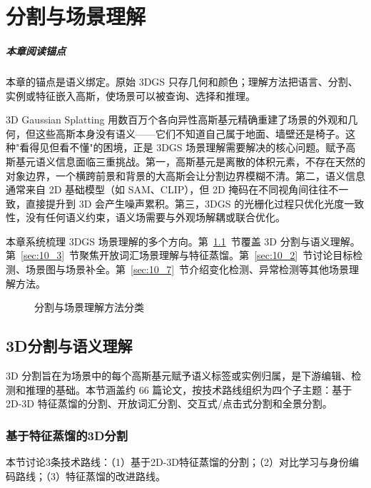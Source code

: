 \chapter{分割与场景理解}
\label{ch:10}

\paragraph*{本章阅读锚点}
本章的锚点是语义绑定。原始 3DGS 只存几何和颜色；理解方法把语言、分割、实例或特征嵌入高斯，使场景可以被查询、选择和推理。


3D Gaussian Splatting 用数百万个各向异性高斯基元精确重建了场景的外观和几何，但这些高斯本身没有语义——它们不知道自己属于地面、墙壁还是椅子。这种"看得见但看不懂"的困境，正是 3DGS 场景理解需要解决的核心问题。赋予高斯基元语义信息面临三重挑战。第一，高斯基元是离散的体积元素，不存在天然的对象边界，一个横跨前景和背景的大高斯会让分割边界模糊不清。第二，语义信息通常来自 2D 基础模型（如 SAM、CLIP），但 2D 掩码在不同视角间往往不一致，直接提升到 3D 会产生噪声累积。第三，3DGS 的光栅化过程只优化光度一致性，没有任何语义约束，语义场需要与外观场解耦或联合优化。

本章系统梳理 3DGS 场景理解的多个方向。第~\ref{sec:10_1}~节覆盖 3D 分割与语义理解。第~\ref{sec:10_3}~节聚焦开放词汇场景理解与特征蒸馏。第~\ref{sec:10_2}~节讨论目标检测、场景图与场景补全。第~\ref{sec:10_7}~节介绍变化检测、异常检测等其他场景理解方法。

\begin{figure}[htbp]
\centering
\resizebox{\textwidth}{!}{}
\caption{分割与场景理解方法分类}
\label{fig:ch10_segmentation_taxonomy}
\end{figure}

\section{3D分割与语义理解}
\label{sec:10_1}

3D 分割旨在为场景中的每个高斯基元赋予语义标签或实例归属，是下游编辑、检测和推理的基础。本节涵盖约 66 篇论文，按技术路线组织为四个子主题：基于 2D-3D 特征蒸馏的分割、开放词汇分割、交互式/点击式分割和全景分割。

\subsection{基于特征蒸馏的3D分割}
\label{ss:10_1}

本节讨论3条技术路线：（1）基于2D-3D特征蒸馏的分割；（2）对比学习与身份编码路线；（3）特征蒸馏的改进路线。


